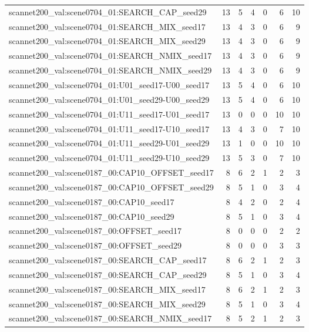 \begin{table}[t]
\begin{tabular}{lrrrrrr}
scannet200\_val:scene0704\_01:SEARCH\_CAP\_seed29 & 13 & 5 & 4 & 0 & 6 & 10 \\
scannet200\_val:scene0704\_01:SEARCH\_MIX\_seed17 & 13 & 4 & 3 & 0 & 6 & 9 \\
scannet200\_val:scene0704\_01:SEARCH\_MIX\_seed29 & 13 & 4 & 3 & 0 & 6 & 9 \\
scannet200\_val:scene0704\_01:SEARCH\_NMIX\_seed17 & 13 & 4 & 3 & 0 & 6 & 9 \\
scannet200\_val:scene0704\_01:SEARCH\_NMIX\_seed29 & 13 & 4 & 3 & 0 & 6 & 9 \\
scannet200\_val:scene0704\_01:U01\_seed17-U00\_seed17 & 13 & 5 & 4 & 0 & 6 & 10 \\
scannet200\_val:scene0704\_01:U01\_seed29-U00\_seed29 & 13 & 5 & 4 & 0 & 6 & 10 \\
scannet200\_val:scene0704\_01:U11\_seed17-U01\_seed17 & 13 & 0 & 0 & 0 & 10 & 10 \\
scannet200\_val:scene0704\_01:U11\_seed17-U10\_seed17 & 13 & 4 & 3 & 0 & 7 & 10 \\
scannet200\_val:scene0704\_01:U11\_seed29-U01\_seed29 & 13 & 1 & 0 & 0 & 10 & 10 \\
scannet200\_val:scene0704\_01:U11\_seed29-U10\_seed29 & 13 & 5 & 3 & 0 & 7 & 10 \\
scannet200\_val:scene0187\_00:CAP10\_OFFSET\_seed17 & 8 & 6 & 2 & 1 & 2 & 3 \\
scannet200\_val:scene0187\_00:CAP10\_OFFSET\_seed29 & 8 & 5 & 1 & 0 & 3 & 4 \\
scannet200\_val:scene0187\_00:CAP10\_seed17 & 8 & 4 & 2 & 0 & 2 & 4 \\
scannet200\_val:scene0187\_00:CAP10\_seed29 & 8 & 5 & 1 & 0 & 3 & 4 \\
scannet200\_val:scene0187\_00:OFFSET\_seed17 & 8 & 0 & 0 & 0 & 2 & 2 \\
scannet200\_val:scene0187\_00:OFFSET\_seed29 & 8 & 0 & 0 & 0 & 3 & 3 \\
scannet200\_val:scene0187\_00:SEARCH\_CAP\_seed17 & 8 & 6 & 2 & 1 & 2 & 3 \\
scannet200\_val:scene0187\_00:SEARCH\_CAP\_seed29 & 8 & 5 & 1 & 0 & 3 & 4 \\
scannet200\_val:scene0187\_00:SEARCH\_MIX\_seed17 & 8 & 6 & 2 & 1 & 2 & 3 \\
scannet200\_val:scene0187\_00:SEARCH\_MIX\_seed29 & 8 & 5 & 1 & 0 & 3 & 4 \\
scannet200\_val:scene0187\_00:SEARCH\_NMIX\_seed17 & 8 & 5 & 2 & 1 & 2 & 3 \\

\end{tabular}
\end{table}
